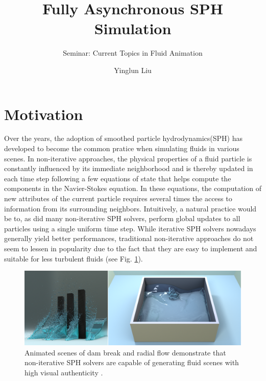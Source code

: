 \documentclass[
	11pt, 
	DIV10,
	ngerman,
	a4paper, 
	oneside, 
	headings=normal, 
	captions=tableheading,
	final, 
	numbers=noenddot
]{scrartcl}
\title{Fully Asynchronous SPH Simulation}
\subtitle{\vspace{0.5cm}Seminar: Current Topics in Fluid Animation}
\author{Yinglun Liu}
\begin{document}
\maketitle


\section{Motivation}

Over the years, the adoption of smoothed particle hydrodynamics(SPH) has developed to become the common pratice when simulating fluids in various scenes. In non-iterative approaches, the physical properties of a fluid particle is constantly influenced by its immediate neighborhood and is thereby updated in each time step following a few equations of state that helps compute the components in the Navier-Stokes equation. In these equations, the computation of new attributes of the current particle requires several times the access to information from its surrounding neighbors. Intuitively, a natural practice would be to, as did many non-iterative SPH solvers, perform global updates to all particles using a single uniform time step. While iterative SPH solvers nowadays generally yield better performances, traditional non-iterative approaches do not seem to lessen in popularity due to the fact that they are easy to implement and suitable for less turbulent fluids (see Fig. \ref{fig1}).

\begin{figure}[tb]
	\centering
	\includegraphics[scale=0.2]{images/3}
	\caption{\label{fig1} Animated scenes of dam break and radial flow demonstrate that non-iterative SPH solvers are capable of generating fluid scenes with high visual authenticity \cite{reinhardt2017fully}.
	}
\end{figure}
\end{document}
